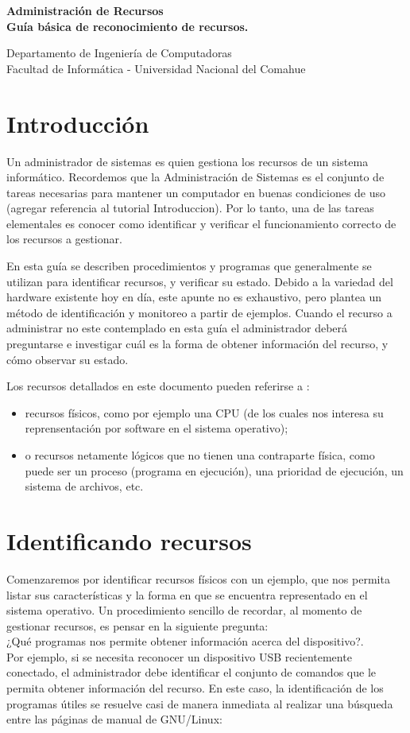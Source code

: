 \documentclass[12pt]{article}
\def\maketitle{

 \makeatletter
 {\color{bl} \centering \huge \sc \textbf{
 Administración de Recursos \\ 
\large \vspace*{-8pt} \color{black} Guía básica de reconocimiento de recursos. 
 \vspace*{8pt} }\par}
 \makeatother


 \makeatletter
 {\centering \small 
 	Departamento de Ingeniería de Computadoras \\
 	Facultad de Informática - Universidad Nacional del Comahue \\
 	\vspace{20pt} }
 \makeatother

}
\begin{document}
\thispagestyle{empty}
\maketitle
\setlength{\parindent}{0pt}

\section*{Introducción}

Un administrador de sistemas es quien gestiona los recursos de un sistema informático. 
Recordemos que la Administración de Sistemas es el conjunto de tareas necesarias para mantener
un computador en buenas condiciones de uso (agregar referencia al tutorial Introduccion).
Por lo tanto, una de las tareas elementales es conocer como
identificar y verificar el funcionamiento correcto de los recursos a gestionar.

En esta guía se describen procedimientos y programas que generalmente se utilizan
para identificar recursos, y verificar su estado.
Debido a la variedad del hardware existente hoy en día, este apunte no es
exhaustivo, pero plantea un método de identificación y monitoreo a partir de ejemplos. 
Cuando 
el recurso a administrar no este contemplado en esta guía el administrador deberá preguntarse e
investigar cuál es la forma de obtener información del recurso, y cómo observar su estado.

Los recursos detallados en este documento pueden referirse a :

\begin{itemize}
	\item recursos físicos, como por ejemplo una CPU (de los cuales nos interesa su reprensentación por software en el sistema operativo);
	\item o recursos netamente lógicos que no tienen una
contraparte física, como puede ser un proceso (programa en ejecución), una prioridad de ejecución, 
un sistema de archivos, etc. 
\end{itemize}



\section*{Identificando recursos}

Comenzaremos por identificar recursos físicos con un ejemplo, que nos permita
listar sus características y la forma en que 
se encuentra representado en el sistema operativo.
Un procedimiento sencillo de recordar, al momento de gestionar recursos, es pensar en la siguiente pregunta: \\
¿Qué programas nos permite obtener información acerca del dispositivo?. \\
Por ejemplo, si se necesita reconocer un dispositivo USB recientemente conectado, 
el administrador debe identificar el conjunto de comandos que le permita obtener información del recurso.
En este caso, la identificación de los programas útiles se resuelve casi 
de manera inmediata al realizar una búsqueda entre las páginas de manual de GNU/Linux: 
\end{document}
